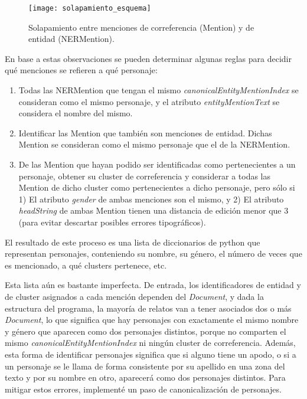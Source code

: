 \documentclass{pre-tfg}
\begin{document}

\begin{figure}
	\centering
	\texttt{[image: solapamiento\_esquema]}
	\caption{Solapamiento entre menciones de correferencia (Mention) y de entidad (NERMention).}
	\label{fig:solapamiento_esquema}
\end{figure}

En base a estas observaciones se pueden determinar algunas reglas para decidir qué menciones se refieren a qué personaje:

\begin{enumerate}
	\item Todas las NERMention que tengan el mismo \textit{canonicalEntityMentionIndex} se consideran como el mismo personaje, y el atributo \textit{entityMentionText} se considera el nombre del mismo.
	\item Identificar las Mention que también son menciones de entidad. Dichas Mention se consideran como el mismo personaje que el de la NERMention.
	\item De las Mention que hayan podido ser identificadas como pertenecientes a un personaje, obtener su cluster de correferencia y considerar a todas las Mention de dicho cluster como pertenecientes a dicho personaje, pero sólo si 1) El atributo \textit{gender} de ambas menciones son el mismo, y 2) El atributo \textit{headString} de ambas Mention tienen una distancia de edición menor que 3 (para evitar descartar posibles errores tipográficos).
\end{enumerate}

El resultado de este proceso es una lista de diccionarios de python que representan personajes, conteniendo su nombre, su género, el número de veces que es mencionado, a qué clusters pertenece, etc.

Esta lista aún es bastante imperfecta. De entrada, los identificadores de entidad y de cluster asignados a cada mención dependen del \textit{Document}, y dada la estructura del programa, la mayoría de relatos van a tener asociados dos o más \textit{Document}, lo que significa que hay personajes con exactamente el mismo nombre y género que aparecen como dos personajes distintos, porque no comparten el mismo \textit{canonicalEntityMentionIndex} ni ningún cluster de correferencia. Además, esta forma de identificar personajes significa que si alguno tiene un apodo, o si a un personaje se le llama de forma consistente por su apellido en una zona del texto y por su nombre en otro, aparecerá como dos personajes distintos. Para mitigar estos errores, implementé un paso de canonicalización de personajes.
\end{document}
